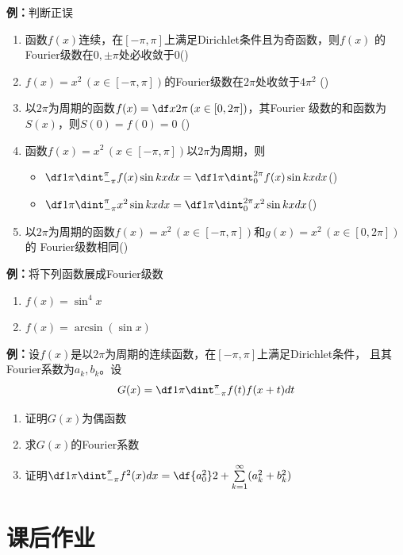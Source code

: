 {\bf 例：}判断正误
\begin{enumerate}[(1)]
  \setlength{\itemindent}{1cm}
  \item 函数$f(x)$连续，在$[-\pi,\pi]$上满足Dirichlet条件且为奇函数，则$f(x)$
  的Fourier级数在$0,\pm\pi$处必收敛于$0$\quad  (\;{$\surd$}\;) 
  \item $f(x)=x^2\,(x\in[-\pi,\pi])$的Fourier级数在$2\pi$处收敛于$4\pi^2$
    \quad(\;{$\times$}\;) 
  \item 以$2\pi$为周期的函数$f(x)=\df x{2\pi}\,(x\in[0,2\pi])$，其Fourier
  级数的和函数为$S(x)$，则$S(0)=f(0)=0$ 
  \quad (\;{$\times$}\;)
  \item 函数$f(x)=x^2\,(x\in[-\pi,\pi])$以$2\pi$为周期，则 
  \begin{itemize}
    \item $\df 1{\pi}\dint_{-\pi}^{\pi}f(x)\sin kxdx=\df
    1{\pi}\dint_{0}^{2\pi}f(x)\sin kxdx$\quad (\;{$\surd$}\;) 
    \item $\df 1{\pi}\dint_{-\pi}^{\pi}x^2\sin kxdx=\df
    1{\pi}\dint_{0}^{2\pi}x^2\sin kxdx$\quad (\;{$\times$}\;) 
  \end{itemize}
  \item 以$2\pi$为周期的函数$f(x)=x^2\,(x\in[-\pi,\pi])$和$g(x)=x^2\,(x\in[0,2\pi])$的
  Fourier级数相同\quad (\;{$\times$}\;)
\end{enumerate}

{\bf 例：}将下列函数展成Fourier级数
\begin{enumerate}[(1)]
  \setlength{\itemindent}{1cm}
  \item $f(x)=\sin^4x$
  \item $f(x)=\arcsin(\sin x)$
\end{enumerate}

{\bf 例：}设$f(x)$是以$2\pi$为周期的连续函数，在$[-\pi,\pi]$上满足Dirichlet条件，
且其Fourier系数为$a_k,b_k$。设
$$G(x)=\df1{\pi}\dint_{-\pi}^{\pi}f(t)f(x+t)dt$$
\begin{enumerate}[(1)]
  \setlength{\itemindent}{1cm}
  \item 证明$G(x)$为偶函数
  \item 求$G(x)$的Fourier系数
  \item 证明$\df1{\pi}\dint_{-\pi}^{\pi}f^2(x)dx=\df{a_0^2}2+
  \sum\limits_{k=1}^{\infty}(a_k^2+b_k^2)$
\end{enumerate}

\newpage

\section*{课后作业}

